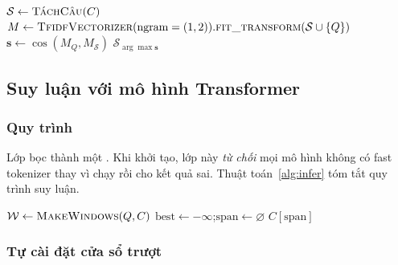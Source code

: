 \begin{algorithm}[H]
\caption{Baseline truy hồi câu bằng TF-IDF}
\label{alg:tfidf}
$\mathcal{S} \leftarrow \textsc{TáchCâu}(C)$\;
$M \leftarrow \textsc{TfidfVectorizer}(\text{ngram}=(1,2)).\textsc{fit\_transform}(\mathcal{S} \cup \{Q\})$\;
$\mathbf{s} \leftarrow \cos(M_Q, M_{\mathcal{S}})$
\Return $\mathcal{S}_{\arg\max \mathbf{s}}$\;
\end{algorithm}

\subsection{Suy luận với mô hình Transformer}
\label{sec:inference}

\subsubsection{Quy trình}

Lớp  bọc  thành một
. Khi khởi tạo, lớp này \emph{từ chối} mọi mô hình không có fast tokenizer
thay vì chạy rồi cho kết quả sai. Thuật toán~\ref{alg:infer} tóm tắt quy trình suy luận.

\begin{algorithm}[H]
\caption{Suy luận hỏi đáp trích xuất với cửa sổ trượt}
\label{alg:infer}
$\mathcal{W} \leftarrow \textsc{MakeWindows}(Q, C)$
$\text{best} \leftarrow -\infty$;\quad $\text{span} \leftarrow \varnothing$\;
\Return $C[\text{span}]$
\end{algorithm}

\subsubsection{Tự cài đặt cửa sổ trượt}
\label{sec:window-bug}

